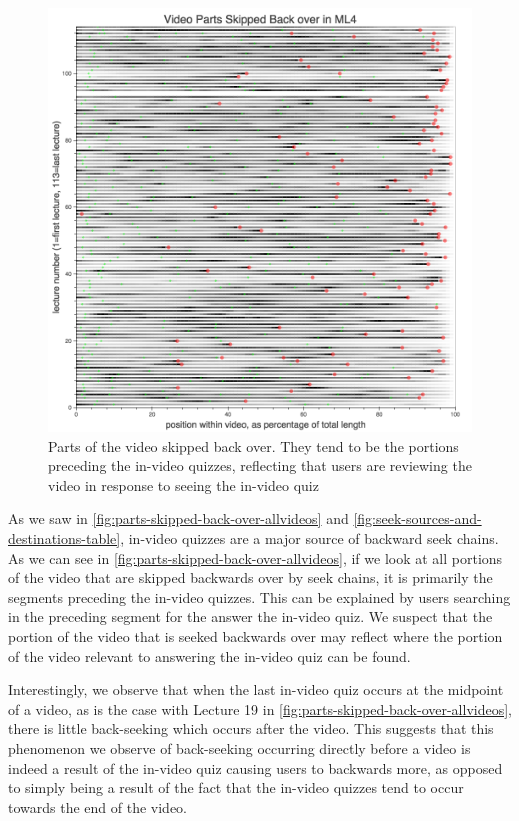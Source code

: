 \documentclass{sigchi}
\begin{document}
\begin{figure}
\includegraphics[width=1.0\columnwidth]{parts-skipped-back-over-allvideos}
\caption{Parts of the video skipped back over. They tend to be the portions preceding the in-video quizzes, reflecting that users are reviewing the video in response to seeing the in-video quiz}
\label{fig:parts-skipped-back-over-allvideos}
\end{figure}

As we saw in \autoref{fig:parts-skipped-back-over-allvideos} and \autoref{fig:seek-sources-and-destinations-table}, in-video quizzes are a major source of backward seek chains. As we can see in \autoref{fig:parts-skipped-back-over-allvideos}, if we look at all portions of the video that are skipped backwards over by seek chains, it is primarily the segments preceding the in-video quizzes. This can be explained by users searching in the preceding segment for the answer the in-video quiz. We suspect that the portion of the video that is seeked backwards over may reflect where the portion of the video relevant to answering the in-video quiz can be found.

Interestingly, we observe that when the last in-video quiz occurs at the midpoint of a video, as is the case with Lecture 19 in \autoref{fig:parts-skipped-back-over-allvideos}, there is little back-seeking which occurs after the video. This suggests that this phenomenon we observe of back-seeking occurring directly before a video is indeed a result of the in-video quiz causing users to backwards more, as opposed to simply being a result of the fact that the in-video quizzes tend to occur towards the end of the video.
\end{document}
